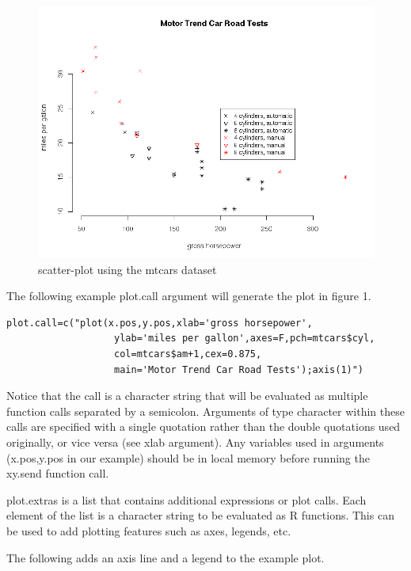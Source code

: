 \documentclass[]{article}
\begin{document}
\begin{center}
\begin{figure}
\includegraphics{exPlotXY}
\caption{scatter-plot using the mtcars dataset}
\end{figure}
\end{center}

The following example plot.call argument will generate the plot in figure 1. 

\begin{verbatim}
plot.call=c("plot(x.pos,y.pos,xlab='gross horsepower',
                   ylab='miles per gallon',axes=F,pch=mtcars$cyl,
                   col=mtcars$am+1,cex=0.875,
                   main='Motor Trend Car Road Tests');axis(1)")
\end{verbatim}


Notice that the call is a character string that will be evaluated as multiple function calls separated by a semicolon. Arguments of type character within these calls are specified with a single quotation rather than the double quotations used originally, or vice versa (see xlab argument). Any variables used in arguments (x.pos,y.pos in our example) should be in local memory before running the xy.send function call. \newline

\indent plot.extras is a list that contains additional expressions or plot calls. Each element of the list is a  character string to be evaluated as R functions. This can be used to add plotting features such as axes, legends, etc. \newline

The following adds an axis line and a legend to the example plot.
\end{document}
